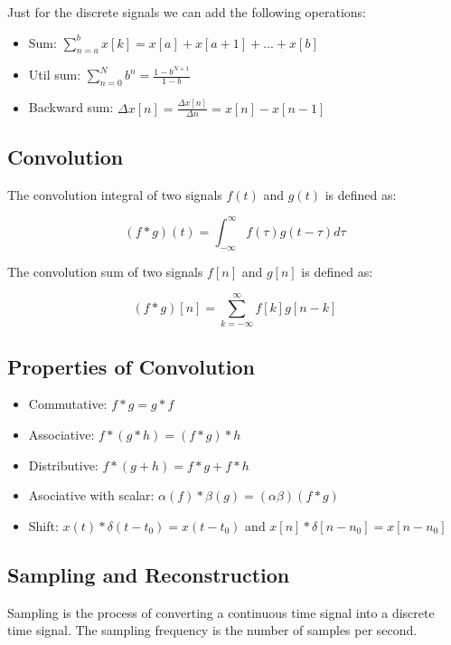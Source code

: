 \documentclass[letterpaper]{article}
\begin{document}
\begin{multicols}{2}
        Just for the discrete signals we can add the following operations:

        \begin{itemize}
            \item Sum: $\sum_{n=a}^{b} x[k]= x[a] + x[a+1] + ... + x[b]$
            \item Util sum: $\sum_{n=0}^{N} b^n = \frac{1-b^{N+1}}{1-b}$
            \item Backward sum: $\Delta x[n] = \frac{\Delta x[n]}{\Delta n} = x[n] - x[n-1]$
        \end{itemize}

        \subsection{Convolution}

        The convolution integral of two signals $f(t)$ and $g(t)$ is defined as:

        \[
            (f*g)(t) = \int_{-\infty}^{\infty} f(\tau)g(t-\tau)d\tau
        \]

        The convolution sum of two signals $f[n]$ and $g[n]$ is defined as:

        \[
            (f*g)[n] = \sum_{k=-\infty}^{\infty} f[k]g[n-k]
        \]

        \subsection{Properties of Convolution}

        \begin{itemize}
            \item Commutative: $f*g = g*f$
            \item Associative: $f*(g*h) = (f*g)*h$
            \item Distributive: $f*(g+h) = f*g + f*h$
            \item Asociative with scalar: $\alpha(f) * \beta (g) = (\alpha \beta)(f*g)$
            \item Shift: $x(t) * \delta(t-t_0) = x(t-t_0)$ and $x[n] * \delta[n-n_0] = x[n-n_0]$
        \end{itemize}

        \subsection{Sampling and Reconstruction}

        Sampling is the process of converting a continuous time signal into a discrete time signal. The sampling frequency is the number of samples per second.


\end{multicols}
\end{document}
